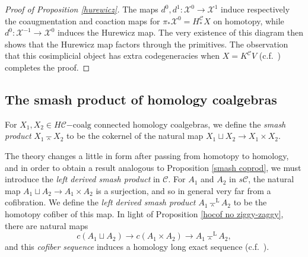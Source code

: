 \documentclass[11pt]{amsart} \renewcommand{\baselinestretch}{1.2}
\theoremstyle{plain}
\numberwithin{equation}{section} %
\theoremstyle{plain}
\numberwithin{equation}{chapter} %
\renewcommand{\to}{\longrightarrow}
\newcommand{\from}{\longleftarrow}
\newcommand{\calx}{\mathcal{X}}
\newcommand{\calc}{\mathcal{C}}
\newcommand{\citeBOX}[2][]{\cite[\mbox{#1}]{#2}}
\newcommand{\HC}[1]{H#1\mathrm{-coalg}}
\newcommand{\smashprod}{\barwedge}%
\newcommand{\Lsmashprod}{\barwedge^\mathrm{L}}%
\newcommand{\SubsectionOrSection}[1]{\subsection{#1}}
\begin{document}
\begin{Pi-algebras and cohomology algebras}
\begin{proof}[Proof of Proposition \ref{hurewicz}]
The maps $d^0,d^1:\calx^{0}\to\calx^{1}$ induce respectively the coaugmentation and coaction maps for $\pi_*\calx^{0}=H_*^{\calc}X$ on homotopy, while $d^0:\calx^{-1}\to\calx^{0}$ induces the Hurewicz map. The very existence of this diagram then shows that the  Hurewicz map factors through the primitives. The  observation   that this cosimplicial object has extra codegeneracies  when $X=K^\calc V$     (c.f.\ \citeBOX[\S4]{BlumRiehlResolutions.pdf}) completes the proof.
\end{proof}

\SubsectionOrSection{The smash product of homology coalgebras}\label{subseq:The smash product}
For $X_1,X_2\in \HC{\calc}$ connected homology coalgebras, we define the \emph{smash product} $X_1\smashprod X_2$ to be the cokernel of the natural map $X_1\sqcup X_2\to X_1\times X_2$. 

The theory changes a little in form after passing from homotopy to homology, and in order to obtain a result analogous to Proposition \ref{smash coprod}, we must introduce the \emph{left derived smash product} in $\calc$. For $A_1$ and $A_2$ in $s\calc$, the natural map $A_1\sqcup A_2\to A_1\times A_2$ is a surjection, and so in general very far from a cofibration. We define the \emph{left derived smash product} $A_1\Lsmashprod A_2$ to be the homotopy cofiber of this map.
In light of Proposition \ref{hocof no ziggy-zaggy}, there are natural maps
\[c(A_1\sqcup A_2)\to c(A_1\times A_2)\to A_1\Lsmashprod A_2,\]
and this \emph{cofiber sequence} induces  a homology long exact sequence (c.f.\ \cite[Proposition 4.6]{MR1089001}).
%
%


\end{Pi-algebras and cohomology algebras}
\end{document}
